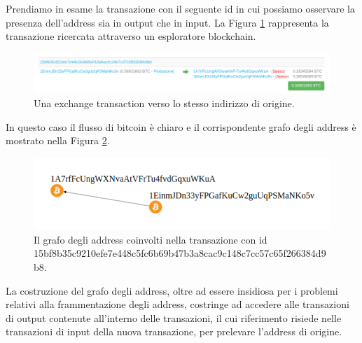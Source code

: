 \begin{example}\label{ex:sameaddr}

  Prendiamo in esame la transazione con il seguente id  in cui possiamo osservare la presenza dell’address  sia in output che in input.
  La Figura \ref{fig:exchangeaddressrecicle} rappresenta la transazione ricercata attraverso un esploratore blockchain.

\begin{figure}
\centering
  \includegraphics[scale=0.35]{images/exampleWithGraph/exchange-tx-with-same-address.png}
  \caption{Una exchange transaction verso lo stesso indirizzo di origine\cite{blockstream:esplora}.\label{fig:exchangeaddressrecicle}}
\end{figure}

  In questo caso il flusso di bitcoin è chiaro e il corrispondente grafo degli address è mostrato  nella Figura \ref{fig:graphAddresssameaddresschange}.

\begin{figure}[H]
\centering
  \includegraphics[scale=0.48]{images/exampleWithGraph/exchange-tx-with-same-address-graph.png}
  \caption{Il grafo degli address coinvolti nella transazione con id 15bf8\-b35c9210\-efe7e448c5fc\-6b69b47b3a\-8cac9c14\-8c7cc57c6\-5f26638\-4d9b8.\label{fig:graphAddresssameaddresschange}}
\end{figure}
\end{example}

La costruzione del grafo degli address, oltre ad essere insidiosa per i problemi relativi alla frammentazione degli address, costringe ad accedere alle transazioni di output contenute all’interno delle transazioni, il cui riferimento risiede nelle transazioni di input della nuova transazione, per prelevare l’address di origine.

